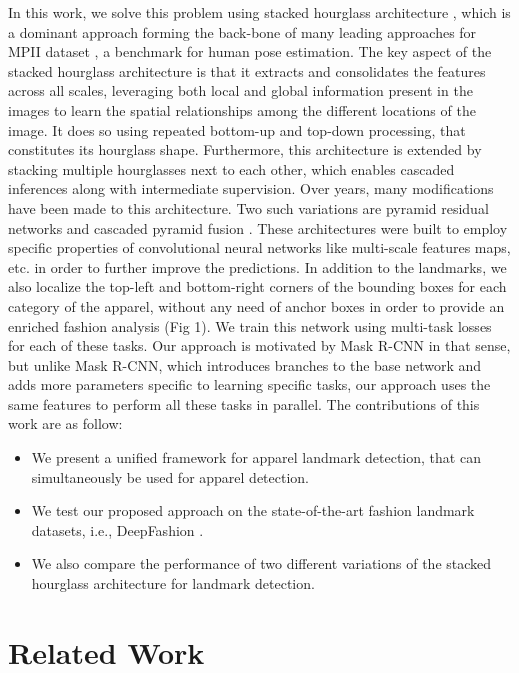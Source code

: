 \documentclass[conference]{IEEEtran}
\begin{document}
In this work, we solve this problem using stacked hourglass  architecture \cite{newell2016stacked}, which is a dominant approach forming the back-bone of many leading approaches for MPII dataset \cite{andriluka20142d}, a benchmark for human pose estimation. The key aspect of the stacked hourglass architecture is that it extracts and consolidates the features across all scales, leveraging both local and global information present in the images to learn the spatial relationships among the different locations of the image. It does so using repeated bottom-up and top-down processing, that constitutes its hourglass shape. Furthermore, this architecture is extended by stacking multiple hourglasses next to each other, which enables cascaded inferences along with intermediate supervision. Over years, many modifications have been made to this architecture. Two such variations are pyramid residual networks \cite{yang2017learning} and cascaded pyramid fusion \cite{zhang2019human}. These architectures were built to employ specific properties of convolutional neural networks like multi-scale features maps, etc. in order to further improve the predictions.
In addition to the landmarks, we also localize the top-left and bottom-right corners of the bounding boxes for each category of the apparel, without any need of anchor boxes in order to provide an enriched fashion analysis (Fig 1). We train this network using multi-task losses for each of these tasks. Our approach is motivated by Mask R-CNN in that sense, but unlike Mask R-CNN, which introduces branches to the base network and adds more parameters specific to learning specific tasks, our approach uses the same features to perform all these tasks in parallel.
The contributions of this work are as follow:
\begin{itemize}
    \item We present a unified framework for apparel landmark detection, that can simultaneously be used for apparel detection.
    \item We test our proposed approach on the state-of-the-art fashion landmark datasets, i.e., DeepFashion \cite{liu2016deepfashion}.  
    \item We also compare the performance of two different variations of the stacked hourglass architecture for landmark detection. 
\end{itemize}

\section{Related Work}
\end{document}
